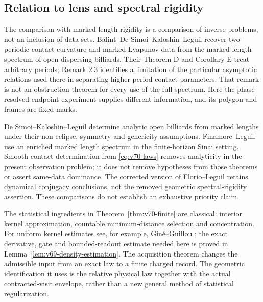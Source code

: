 



\subsection{Relation to lens and spectral rigidity}



The comparison with marked length rigidity is a comparison of inverse
problems, not an inclusion of data sets.  B\'alint--De Simoi--Kaloshin--Leguil
\cite{BDKL} recover two-periodic contact curvature and marked Lyapunov
data from the marked length spectrum of open dispersing billiards.
Their Theorem D and Corollary E treat arbitrary periods; Remark 2.3
identifies a limitation of the particular asymptotic relations used
there in separating higher-period contact parameters.  That remark is
not an obstruction theorem for every use of the full spectrum.  Here
the phase-resolved endpoint experiment supplies different information,
and its polygon and frames are fixed marks.

De Simoi--Kaloshin--Leguil \cite{DSKL} determine analytic open billiards
from marked lengths under their non-eclipse, symmetry and genericity
assumptions.  Finamore--Leguil \cite{FinamoreLeguil} use an enriched
marked length spectrum in the finite-horizon Sinai setting.  Smooth
contact determination from \eqref{eq:v70-laws} removes analyticity
in the present observation problem; it does not remove hypotheses
from those theorems or assert same-data dominance.  The corrected
version of Florio--Leguil \cite{FlorioLeguil} retains dynamical
conjugacy conclusions, not the removed geometric spectral-rigidity
assertion.  These comparisons do not establish an exhaustive priority
claim.

The statistical ingredients in Theorem~\ref{thm:v70-finite} are classical:
interior kernel approximation, countable minimum-distance selection and
concentration.  For uniform kernel estimates see, for example,
Gin\'e--Guillou \cite{GineGuillou2002}; the exact derivative, gate and
bounded-readout estimate needed here is proved in
Lemma~\ref{lem:v69-density-estimation}.  The acquisition theorem changes
the admissible input from an exact law to a finite charged record.  The
geometric identification it uses is the relative physical law together
with the actual contracted-visit envelope, rather than a new general
method of statistical regularization.

